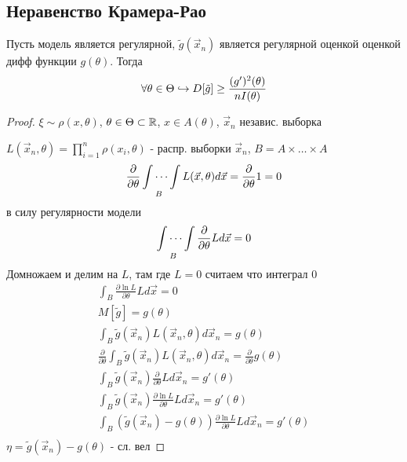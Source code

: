 \documentclass{article}
\begin{document}
\subsection{Неравенство Крамера-Рао}
\begin{theorem}
Пусть модель является регулярной, $\tilde{g}(\vec{x}_n)$
является регулярной оценкой оценкой дифф функции $g(\theta)$.
Тогда
\[
  \forall \theta \in \Theta \hookrightarrow D[\tilde{g}]\ge \frac{(g')^{2}(\theta)}{nI(\theta)}
\]
\end{theorem}
\begin{proof}
  $\xi \sim \rho(x,\theta)$, $\theta\in\Theta\subset \mathbb{R}$, $x\in A(\theta)$,
  $\vec{x}_n$ независ. выборка

  $L(\vec{x}_n,\theta)=\prod_{i=1}^{n}\rho(x_i,\theta)$ - распр. выборки $\vec{x}_n$,
  $B=A\times\dots \times A$
  \[
    \frac{\partial}{\partial\theta}\idotsint \limits_{B} L(\vec{x},\theta)d\vec{x}=\frac{\partial}{\partial\theta}1=0
  \]
  в силу регулярности модели
  \[
    \idotsint \limits_{B}\frac{\partial}{\partial\theta}Ld\vec{x}=0 \\ 
  \]
  Домножаем и делим на $L$, там где $L=0$ считаем что интеграл $0$
  \begin{gather*}
    \int_{B}^{}\frac{\partial\ln L}{\partial \theta}Ld\vec{x}=0 \\ 
    M[\tilde{g}]=g(\theta) \\ 
    \int_{B}^{}\tilde{g}(\vec{x}_n)L(\vec{x}_n,\theta)d\vec{x}_n=g(\theta) \\
    \frac{\partial}{\partial \theta}\int_{B}^{}\tilde{g}(\vec{x}_n)L(\vec{x}_n,\theta)d\vec{x}_n=\frac{\partial}{\partial \theta}g(\theta) \\ 
    \int_{B}^{}\tilde{g}(\vec{x}_n)\frac{\partial}{\partial \theta}Ld\vec{x}_n=g'(\theta) \\ 
    \int_{B}^{}\tilde{g}(\vec{x}_n)\frac{\partial \ln L}{\partial \theta}Ld\vec{x}_n=g'(\theta) \\ 
    \int_{B}^{}(\tilde{g}(\vec{x}_n)-g(\theta))\frac{\partial \ln L}{\partial \theta}Ld\vec{x}_n=g'(\theta) \\ 
  \end{gather*}
  $\eta=\tilde{g}(\vec{x}_n)-g(\theta)$ - сл. вел


\end{proof}
\end{document}
